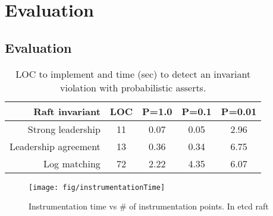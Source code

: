 \if{}
\chapter{Evaluation}
\else
\section{Evaluation}  
\fi
\label{sec:eval}
\newcommand{\firstcolcell}[1]{
  \pbox{3cm}{#1}
} 

\begin{table*}[t]
  \centering
    \begin{tabular}{rcccc}
    \hline
      \textbf{Raft invariant}   & \textbf{LOC} & \textbf{P=1.0} & \textbf{P=0.1} & \textbf{P=0.01} \\
    \hline
      Strong leadership    & 11           & 0.07          & 0.05          & 2.96          \\
      Leadership agreement & 13           & 0.36          & 0.34          & 6.75          \\
      Log matching         & 72           & 2.22          & 4.35          & 6.07          \\
    \hline
  \end{tabular}
    \caption{LOC to implement and time (sec) to detect an invariant
      violation with probabilistic asserts.}
  \label{table:assert-perf}
\end{table*}


 \begin{figure}[h]
     \texttt{[image: fig/instrumentationTime]}
    \caption{Instrumentation time vs \# of instrumentation points. In etcd raft}
     \label{fig:inst-perf}
 \end{figure}
